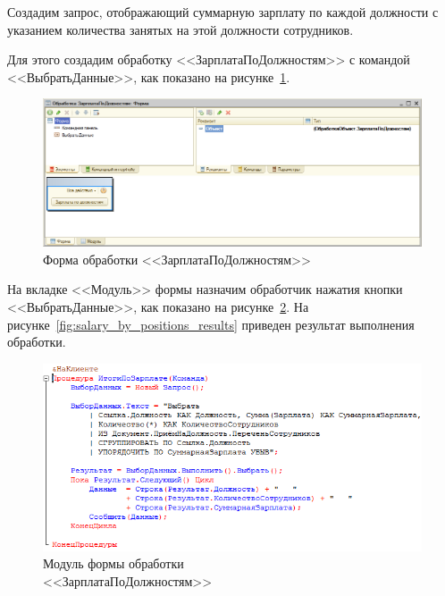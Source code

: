 
Создадим запрос, отображающий суммарную зарплату по каждой должности
с указанием количества занятых на этой должности сотрудников.

Для этого создадим обработку <<ЗарплатаПоДолжностям>>
с командой <<ВыбратьДанные>>,
как показано на рисунке~\ref{fig:salary_by_positions_form}.
\begin{figure}[h!]
  \centering
  \includegraphics[width=160mm]{pic/salary_by_positions_form}
  \caption{Форма обработки <<ЗарплатаПоДолжностям>>}
  \label{fig:salary_by_positions_form}
\end{figure}

\pagebreak

На вкладке <<Модуль>> формы назначим обработчик нажатия кнопки
<<ВыбратьДанные>>, как показано на рисунке~\ref{fig:salary_by_positions_code}.
На рисунке~\ref{fig:salary_by_positions_results} приведен результат
выполнения обработки.
\begin{figure}[h!]
  \centering
  \includegraphics[width=150mm]{pic/salary_by_positions_code}
  \caption{Модуль формы обработки \\ <<ЗарплатаПоДолжностям>>}
  \label{fig:salary_by_positions_code}
\end{figure}

